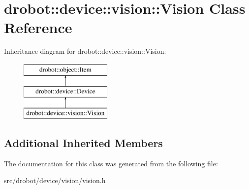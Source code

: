 \hypertarget{classdrobot_1_1device_1_1vision_1_1Vision}{\section{drobot\-:\-:device\-:\-:vision\-:\-:Vision Class Reference}
\label{classdrobot_1_1device_1_1vision_1_1Vision}
}
Inheritance diagram for drobot\-:\-:device\-:\-:vision\-:\-:Vision\-:\begin{figure}[H]
\begin{center}
\leavevmode
\includegraphics[height=3.000000cm]{classdrobot_1_1device_1_1vision_1_1Vision}
\end{center}
\end{figure}
\subsection*{Additional Inherited Members}


The documentation for this class was generated from the following file\-:\begin{DoxyCompactItemize}
\item 
src/drobot/device/vision/vision.\-h\end{DoxyCompactItemize}
